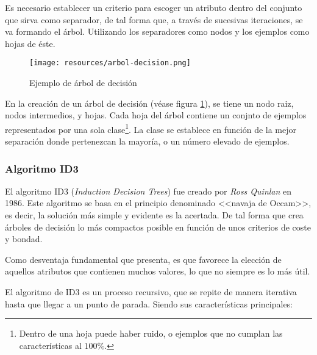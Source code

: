\documentclass[a4paper, 11pt, titlepage]{article}
\begin{document}
\begin{itemize}
                Es necesario establecer un criterio para escoger un atributo dentro del conjunto que sirva como 
                separador, de tal forma que, a través de sucesivas iteraciones, se va formando el árbol. 
                Utilizando los separadores como nodos y los ejemplos como hojas de éste.

                \begin{figure}[htp]
                    \centering
                    \texttt{[image: resources/arbol-decision.png]}
                    \caption{Ejemplo de árbol de decisión}
                    \label{arboldecision}
                \end{figure}    
        
                En la creación de un árbol de decisión (véase figura \ref{arboldecision}), se tiene un 
                nodo raiz, nodos intermedios, y hojas. Cada hoja del árbol contiene un conjnto de ejemplos 
                representados por una sola clase\footnote{
                    Dentro de una hoja puede haber ruido, o ejemplos que no cumplan las características 
                    al $100\%$.
                }. La clase se establece en función de la mejor separación donde pertenezcan la mayoría, 
                o un número elevado de ejemplos.

            \end{itemize}

        \subsubsection{Algoritmo ID3}

            El algoritmo ID3 (\textit{Induction Decision Trees}) fue creado por \textit{Ross Quinlan} en 
            1986. Este algoritmo se basa en el principio denominado <<navaja de Occam>>, es decir, la solución 
            más simple y evidente es la acertada. De tal forma que crea árboles de decisión lo más compactos 
            posible en función de unos criterios de coste y bondad.

            Como desventaja fundamental que presenta, es que favorece la elección de aquellos atributos que contienen 
            muchos valores, lo que no siempre es lo más útil.

            El algoritmo de ID3 es un proceso recursivo, que se repite de manera iterativa hasta que llegar a un punto 
            de parada. Siendo sus características principales:
\end{document}
